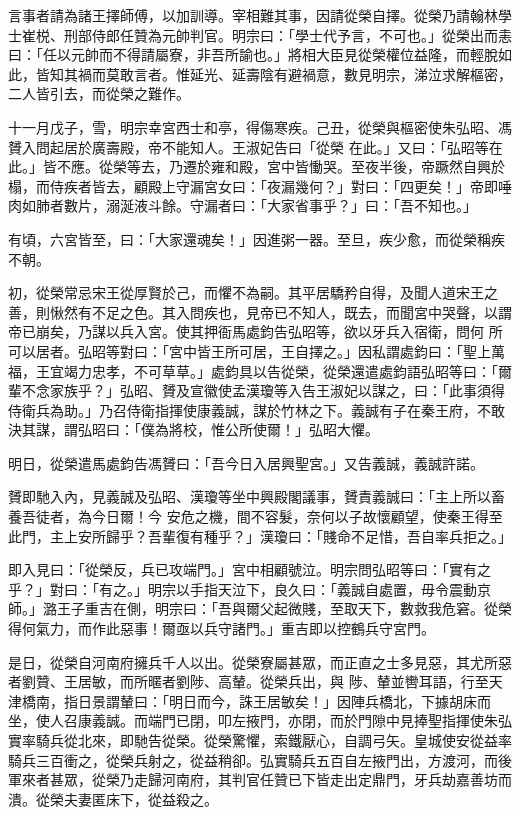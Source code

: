 \begin{pinyinscope}
 言事者請為諸王擇師傅，以加訓導。宰相難其事，因請從榮自擇。從榮乃請翰林學士崔棁、刑部侍郎任贊為元帥判官。明宗曰：「學士代予言，不可也。」從榮出而恚曰：「任以元帥而不得請屬寮，非吾所諭也。」將相大臣見從榮權位益隆，而輕脫如此，皆知其禍而莫敢言者。惟延光、延壽陰有避禍意，數見明宗，涕泣求解樞密，二人皆引去，而從榮之難作。



 十一月戊子，雪，明宗幸宮西士和亭，得傷寒疾。己丑，從榮與樞密使朱弘昭、馮贇入問起居於廣壽殿，帝不能知人。王淑妃告曰「從榮
 在此。」又曰：「弘昭等在此。」皆不應。從榮等去，乃遷於雍和殿，宮中皆慟哭。至夜半後，帝蹶然自興於榻，而侍疾者皆去，顧殿上守漏宮女曰：「夜漏幾何？」對曰：「四更矣！」帝即唾肉如肺者數片，溺涎液斗餘。守漏者曰：「大家省事乎？」曰：「吾不知也。」



 有頃，六宮皆至，曰：「大家還魂矣！」因進粥一器。至旦，疾少愈，而從榮稱疾不朝。



 初，從榮常忌宋王從厚賢於己，而懼不為嗣。其平居驕矜自得，及聞人道宋王之善，則愀然有不足之色。其入問疾也，見帝已不知人，既去，而聞宮中哭聲，以謂帝已崩矣，乃謀以兵入宮。使其押衙馬處鈞告弘昭等，欲以牙兵入宿衛，問何
 所可以居者。弘昭等對曰：「宮中皆王所可居，王自擇之。」因私謂處鈞曰：「聖上萬福，王宜竭力忠孝，不可草草。」處鈞具以告從榮，從榮還遣處鈞語弘昭等曰：「爾輩不念家族乎？」弘昭、贇及宣徽使孟漢瓊等入告王淑妃以謀之，曰：「此事須得侍衛兵為助。」乃召侍衛指揮使康義誠，謀於竹林之下。義誠有子在秦王府，不敢決其謀，謂弘昭曰：「僕為將校，惟公所使爾！」弘昭大懼。



 明日，從榮遣馬處鈞告馮贇曰：「吾今日入居興聖宮。」又告義誠，義誠許諾。



 贇即馳入內，見義誠及弘昭、漢瓊等坐中興殿閣議事，贇責義誠曰：「主上所以畜養吾徒者，為今日爾！今
 安危之機，間不容髮，奈何以子故懷顧望，使秦王得至此門，主上安所歸乎？吾輩復有種乎？」漢瓊曰：「賤命不足惜，吾自率兵拒之。」



 即入見曰：「從榮反，兵已攻端門。」宮中相顧號泣。明宗問弘昭等曰：「實有之乎？」對曰：「有之。」明宗以手指天泣下，良久曰：「義誠自處置，毋令震動京師。」潞王子重吉在側，明宗曰：「吾與爾父起微賤，至取天下，數救我危窘。從榮得何氣力，而作此惡事！爾亟以兵守諸門。」重吉即以控鶴兵守宮門。



 是日，從榮自河南府擁兵千人以出。從榮寮屬甚眾，而正直之士多見惡，其尤所惡者劉贊、王居敏，而所暱者劉陟、高輦。從榮兵出，與
 陟、輦並轡耳語，行至天津橋南，指日景謂輦曰：「明日而今，誅王居敏矣！」因陣兵橋北，下據胡床而坐，使人召康義誠。而端門已閉，叩左掖門，亦閉，而於門隙中見捧聖指揮使朱弘實率騎兵從北來，即馳告從榮。從榮驚懼，索鐵厭心，自調弓矢。皇城使安從益率騎兵三百衝之，從榮兵射之，從益稍卻。弘實騎兵五百自左掖門出，方渡河，而後軍來者甚眾，從榮乃走歸河南府，其判官任贊已下皆走出定鼎門，牙兵劫嘉善坊而潰。從榮夫妻匿床下，從益殺之。




\end{pinyinscope}
